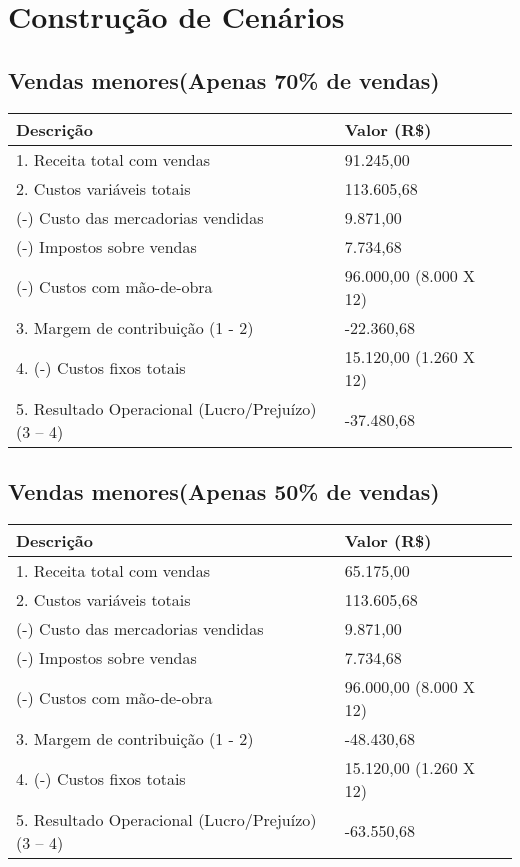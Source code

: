 \chapter{Construção de Cenários}

\section{Vendas menores(Apenas 70\% de vendas)}
  
\begin{tabular}{| l | l | l |}
  \hline
  \textbf{Descrição} & \textbf{Valor (R\$)}\\ \hline
  1. Receita total com vendas & 91.245,00\\ \hline \hline
  2. Custos variáveis totais & 113.605,68\\ \hline
  (-) Custo das mercadorias vendidas & 9.871,00\\ \hline
  (-) Impostos sobre vendas & 7.734,68\\ \hline
  (-) Custos com mão-de-obra & 96.000,00 (8.000 X 12)\\ \hline \hline
  3. Margem de contribuição (1 - 2) & -22.360,68\\ \hline \hline
  4. (-) Custos fixos totais & 15.120,00 (1.260 X 12)\\ \hline \hline 
  5. Resultado Operacional (Lucro/Prejuízo) (3 – 4) & -37.480,68\\ \hline
\end{tabular}


\section{Vendas menores(Apenas 50\% de vendas)}
  
\begin{tabular}{| l | l | l |}
  \hline
  \textbf{Descrição} & \textbf{Valor (R\$)}\\ \hline
  1. Receita total com vendas & 65.175,00\\ \hline \hline
  2. Custos variáveis totais & 113.605,68\\ \hline
  (-) Custo das mercadorias vendidas & 9.871,00\\ \hline
  (-) Impostos sobre vendas & 7.734,68\\ \hline
  (-) Custos com mão-de-obra & 96.000,00 (8.000 X 12)\\ \hline \hline
  3. Margem de contribuição (1 - 2) & -48.430,68\\ \hline \hline
  4. (-) Custos fixos totais & 15.120,00 (1.260 X 12)\\ \hline \hline 
  5. Resultado Operacional (Lucro/Prejuízo) (3 – 4) & -63.550,68\\ \hline
\end{tabular}